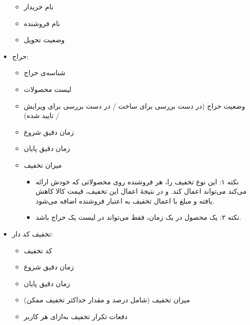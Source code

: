 \documentclass[]{article}
\begin{document}
\begin{itemize}
\begin{itemize}
\item
نام خریدار

\item
نام فروشنده

\item
وضعیت تحویل

\end{itemize}

\item
حراج:

\begin{itemize}

\item
شناسه‌ی حراج 

\item
لیست محصولات

\item
وضعیت حراج (در دست بررسی برای ساخت / در دست بررسی برای ویرایش / تایید شده)

\item
زمان دقیق شروع

\item
زمان دقیق پایان

\item
میزان تخفیف


\begin{itemize}[label = $\blacksquare$]
\item
نکته ۱: این نوع تخفیف را، هر فروشنده روی محصولاتی که خودش ارائه می‌کند می‌تواند اعمال کند. و 
در نتیجهٔ اعمال این تخفیف، قیمت کالا کاهش یافته و مبلغ با اعمال تخفیف به اعتبار فروشنده اضافه می‌شود.

\item
نکته ۲:‌ یک محصول در یک زمان، فقط می‌تواند در لیست یک حراج باشد.
\end{itemize}

\end{itemize}

\item
تخفیف کد دار:

\begin{itemize}
\item
کد تخفیف

\item
زمان دقیق شروع

\item
زمان دقیق پایان

\item
میزان تخفیف (شامل درصد و مقدار حداکثر تخفیف ممکن)

\item
دفعات تکرار تخفیف به‌ازای هر کاربر


\end{itemize}
\end{itemize}
\end{document}
